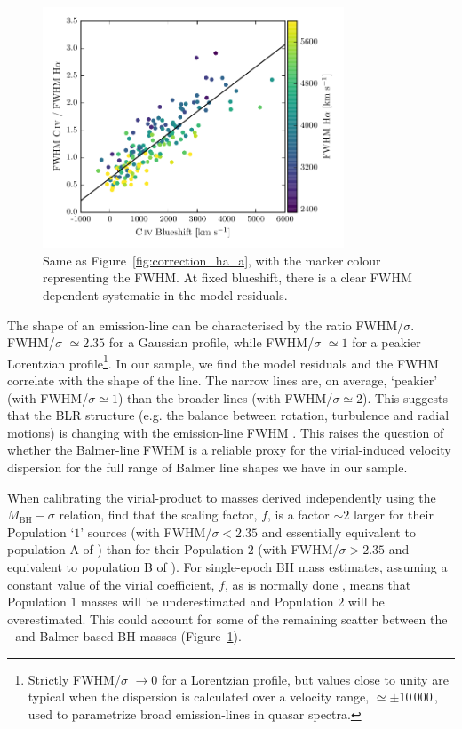 \begin{figure}
    \centering
    \includegraphics[width=0.8\textwidth]{figures/chapter03/fwhm_correction_color.pdf}
    \caption[{Same as Figure~\ref{fig:correction_ha_a}, with the marker colour representing the \ha FWHM.}]{Same as Figure~\ref{fig:correction_ha_a}, with the marker colour representing the \ha FWHM. At fixed  blueshift, there is a clear \ha FWHM dependent systematic in the model residuals.}
    \label{fig:residuals_ha_fwhm}
\end{figure}


The shape of an emission-line can be characterised by the ratio FWHM/$\sigma$.
FWHM/$\sigma$ $\simeq 2.35$ for a Gaussian profile, while FWHM/$\sigma$ $\simeq 1$ for a peakier Lorentzian profile\footnote{Strictly FWHM/$\sigma$ $\rightarrow 0$ for a Lorentzian profile, but values close to unity are typical when the dispersion is calculated over a velocity range, $\simeq\pm10\,000$\,\kms, used to parametrize broad emission-lines in quasar spectra.}.
In our sample, we find the model residuals and the \ha FWHM correlate with the shape of the line.
The narrow lines are, on average, `peakier' (with FWHM/$\sigma\simeq1$) than the broader lines (with FWHM/$\sigma\simeq2$).
This suggests that the BLR structure (e.g. the balance between rotation, turbulence and radial motions) is changing with the emission-line FWHM \citep[e.g.][]{collin06,kollatschny11,Kollatschny13}.
This raises the question of whether the Balmer-line FWHM is a reliable proxy for the virial-induced velocity dispersion for the full range of Balmer line shapes we have in our sample.

When calibrating the virial-product to masses derived independently using the $M_{\text{BH}}-\sigma$ relation, \citet{collin06} find that the scaling factor, $f$, is a factor $\sim2$ larger for their Population `$1$' sources (with FWHM/$\sigma < 2.35$ and essentially equivalent to population A of \citealt{sulentic00b}) than for their Population $2$ (with FWHM/$\sigma > 2.35$ and equivalent to population B of \citealt{sulentic00b}).
For single-epoch BH mass estimates, assuming a constant value of the virial coefficient, $f$, as is normally done \citep[e.g.][]{vestergaard06}, means that Population $1$ masses will be underestimated and Population $2$ will be overestimated.
This could account for some of the remaining scatter between the - and Balmer-based BH masses (Figure~\ref{fig:residuals_ha_fwhm}).

